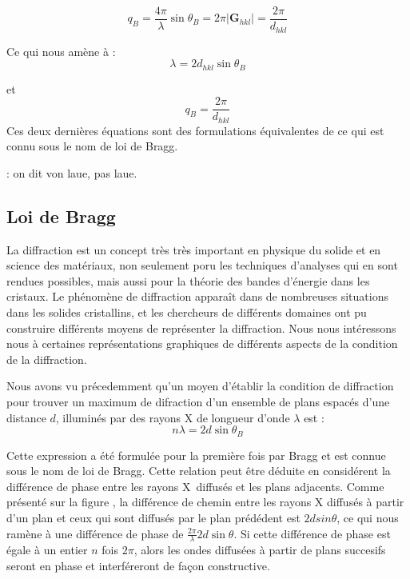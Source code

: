 \begin{equation}
    q_B = \frac{4\pi}{\lambda} \sin \theta_B = 2\pi |\mathbf{G}_{hkl} | = \frac{2\pi}{d_{hkl}}
\end{equation}

Ce qui nous amène à :
\begin{equation}
    \lambda = 2 d_{hkl} \sin \theta_B
\end{equation}

et
\begin{equation}
    q_B = \frac{2\pi}{d_{hkl}}
\end{equation}
Ces deux dernières équations sont des formulations équivalentes de ce qui est
connu sous le nom de loi de Bragg.

\TODO: on dit von laue, pas laue.

\subsection{Loi de Bragg}

La diffraction est un concept très très important en physique du solide et en
science des matériaux, non seulement poru les techniques d'analyses qui en sont
rendues possibles, mais aussi pour la théorie des bandes d'énergie dans les
cristaux. Le phénomène de diffraction apparaît dans de nombreuses situations dans
les solides cristallins, et les chercheurs de différents domaines ont pu
construire différents moyens de représenter la diffraction. Nous nous intéressons
nous à certaines représentations graphiques de différents aspects de la
condition de la diffraction.

Nous avons vu précedemment qu'un moyen d'établir la condition de diffraction pour
trouver un maximum de difraction d'un ensemble de plans espacés d'une distance
$d$, illuminés par des rayons X de longueur d'onde $\lambda$ est :
\begin{equation}
    n \lambda = 2d \sin \theta_B
\end{equation}

Cette expression a été formulée pour la première fois par Bragg et est connue
sous le nom de loi de Bragg. Cette relation peut être déduite en considérent la
différence de phase entre les rayons X diffusés et les plans adjacents. Comme
présenté sur la figure \TODO, la différence de chemin entre les rayons X diffusés
à partir d'un plan et ceux qui sont diffusés par le plan prédédent est 
$2d sin \theta$, ce qui nous ramène à une différence de phase de
$\frac{2\pi}{\lambda} 2d \sin \theta$. Si cette différence de phase est égale à
un entier $n$ fois $2\pi$, alors les ondes diffusées à partir de plans succesifs
seront en phase et interféreront de façon constructive.

